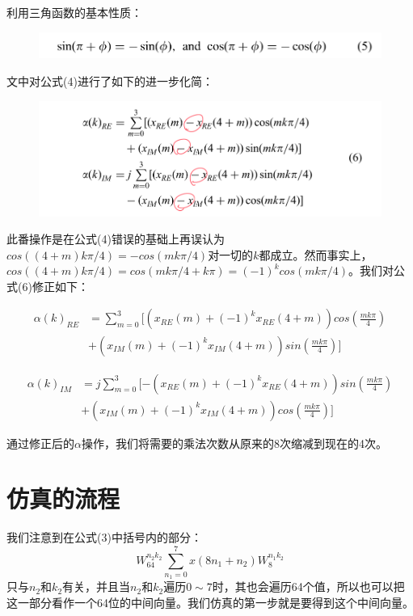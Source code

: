 \documentclass[a4paper, 12pt]{ctexart}
\begin{document}
利用三角函数的基本性质：
\begin{figure}[h]
    \centering
    \includegraphics[width=0.8\linewidth]{5.png}
\end{figure}

文中对公式(4)进行了如下的进一步化简：
\begin{figure}[h]
    \centering
    \includegraphics[width=0.8\linewidth]{6.png}
\end{figure}

此番操作是在公式(4)错误的基础上再误认为$cos((4 + m)k \pi / 4) = -cos(mk \pi / 4)$对一切的$k$都成立。然而事实上，$cos((4 + m)k \pi / 4) = cos(mk \pi / 4 + k \pi) = (-1)^k cos(mk \pi / 4)$。我们对公式(6)修正如下：

\begin{equation*}
    \begin{aligned}
        \alpha(k)_{RE} &= \sum_{m=0}^3 [(x_{RE}(m) + (-1)^k x_{RE}(4 + m))cos(\frac{mk \pi}{4})\\
        &+(x_{IM}(m) + (-1)^k x_{IM}(4 + m))sin(\frac{mk \pi}{4})]
    \end{aligned}
\end{equation*}

\begin{equation*}
    \begin{aligned}
        \alpha(k)_{IM} &= j\sum_{m=0}^3[-(x_{RE}(m) + (-1)^k x_{RE}(4 + m))sin(\frac{mk \pi}{4})\\
        &+ (x_{IM}(m) +(-1)^k x_{IM}(4 + m))cos(\frac{mk \pi}{4})]
    \end{aligned}
\end{equation*}

通过修正后的$\alpha$操作，我们将需要的乘法次数从原来的8次缩减到现在的4次。

\section{仿真的流程}

我们注意到在公式(3)中括号内的部分：
$$W_{64}^{n_2k_2} \sum_{n_1 = 0}^{7} x(8n_1 + n_2)W_8^{n_1k_2}$$
只与$n_2$和$k_2$有关，并且当$n_2$和$k_2$遍历$0 \sim 7$时，其也会遍历64个值，所以也可以把这一部分看作一个64位的中间向量。我们仿真的第一步就是要得到这个中间向量。
\end{document}

